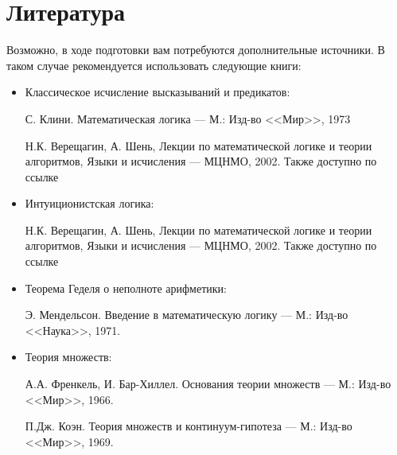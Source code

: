 \section{Литература}
Возможно, в ходе подготовки вам потребуются дополнительные источники.
В таком случае рекомендуется использовать следующие книги:

\begin{itemize}
\item Классическое исчисление высказываний и предикатов:

С. Клини. Математическая логика --- М.: Изд-во <<Мир>>, 1973

Н.К. Верещагин, А. Шень, Лекции по математической логике и теории алгоритмов, Языки и исчисления --- МЦНМО, 2002.
Также доступно по ссылке\\

\item Интуиционистская логика: 

Н.К. Верещагин, А. Шень, Лекции по математической логике и теории алгоритмов, Языки и исчисления --- МЦНМО, 2002.
Также доступно по ссылке\\

\item Теорема Геделя о неполноте арифметики: 

Э. Мендельсон. Введение в математическую логику --- М.: Изд-во <<Наука>>, 1971.

\item Теория множеств: 

А.А. Френкель, И. Бар-Хиллел. Основания теории множеств --- М.: Изд-во <<Мир>>, 1966.

П.Дж. Коэн. Теория множеств и континуум-гипотеза --- М.: Изд-во <<Мир>>, 1969.

\end{itemize}
